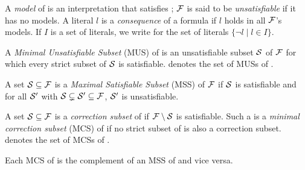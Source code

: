 A \emph{model} of \formula is an interpretation that satisfies \formula; 
$\mathcal{F} $ is said to be \emph{unsatisfiable} if it has no models.
A literal $l$ is a \emph{consequence} of a formula \formula if $l$ holds in all $\mathcal{F} $'s models. %
If $I$ is a set of literals, we write  for the set of literals $\{\lnot l\mid l\in I\}$.

\begin{definition}

  A \emph{Minimal Unsatisfiable Subset} (MUS) of 
  \F is an unsatisfiable subset $\mathcal{S}$ of $\mathcal{F} $ for which every strict subset of $\mathcal{S} $ is satisfiable. 
%   
  \muses{\F} denotes the set of MUSs of \F. 
\end{definition}



\begin{definition}
    A set $\mathcal{S} \subseteq \mathcal{F} $ is a \emph{Maximal Satisfiable Subset} (MSS) of $ \mathcal{F} $ if $\mathcal{S}$ is satisfiable and for all $\mathcal{S}'$ with $\mathcal{S}  \subsetneq  \mathcal{S}'\subseteq\mathcal{F}  $, $\mathcal{S}'$ is unsatisfiable.
\end{definition}

\begin{definition}
    A set $\mathcal{S} \subseteq \mathcal{F} $ is a \emph{correction subset} of \formula if $\mathcal{F} \setminus\mathcal{S}$ is satisfiable. 
    Such a  is a \emph{minimal correction subset} (MCS)  of \formula if no strict subset of  is also a correction subset. 
    \mcses{\F} denotes the set of MCSs of \F. 
\end{definition}
% 
Each  MCS of \formula is the complement of an MSS of \formula and vice versa. 

